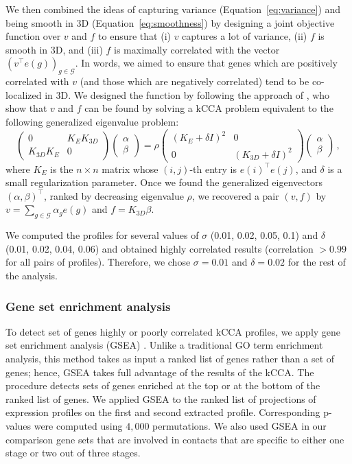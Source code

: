 We then combined the ideas of capturing variance (Equation~\ref{eq:variance}) and being
smooth in 3D (Equation~\ref{eq:smoothness}) by designing a joint objective function
over $v$ and $f$ to ensure that (i) $v$ captures a lot of variance, (ii) $f$
is smooth in 3D, and (iii) $f$ is maximally correlated with the vector
$\left(v^\top e(g)\right)_{g\in\mathcal{G}}$. In words, we aimed to ensure that
genes which are positively correlated with $v$ (and those which are negatively
correlated) tend to be co-localized in 3D. We designed the function by following
the approach of \cite{bach:kernel}, who show that $v$ and $f$
can be found by solving a kCCA problem equivalent to the following generalized
eigenvalue problem:
\[
\left(\begin{array}{cc}0 & K_E K_{3D} \\ K_{3D} K_E & 0\end{array}\right)
\left(\begin{array}{c}\alpha \\ \beta\end{array}\right)
= \rho
\left(\begin{array}{cc}(K_E+\delta I)^2 & 0 \\ 0 & (K_{3D}+\delta I)^2\end{array}\right)
\left(\begin{array}{c}\alpha \\ \beta\end{array}\right)\,,
\]
where $K_{E}$ is the $n \times n$ matrix whose $(i,j)$-th entry is $e(i)^\top
e(j)$, and $\delta$ is a small regularization parameter. Once we found the
generalized eigenvectors $(\alpha,\beta)^\top$, ranked by decreasing
eigenvalue $\rho$, we recovered a pair $(v,f)$ by $v = \sum_{g\in\mathcal{G}}
\alpha_g e(g)$ and $f=K_{3D} \beta$.

We computed the profiles for several values of $\sigma$ (0.01, 0.02, 0.05,
0.1) and $\delta$ (0.01, 0.02, 0.04, 0.06) and obtained highly correlated results
(correlation $>0.99$ for all pairs of profiles). Therefore, we chose
$\sigma = 0.01$ and $\delta = 0.02$ for the rest of the analysis.

\subsubsection*{Gene set enrichment analysis}
\label{met:GSEA}
To detect set of genes highly or poorly correlated kCCA profiles, we apply gene
set enrichment analysis (GSEA) \citep{subramanian:gene}. Unlike a traditional
GO term enrichment analysis, this method takes as input a ranked list of genes
rather than a set of genes; hence, GSEA takes full advantage of the results of
the kCCA.  The procedure detects sets of genes enriched at the top or at the
bottom of the ranked list of genes. We applied GSEA to the ranked list of projections
of expression profiles on the first and second extracted profile. Corresponding
p-values were computed using $4,000$ permutations. We also used GSEA in our
comparison gene sets that are involved in contacts that are specific to either
one stage or two out of three stages.



